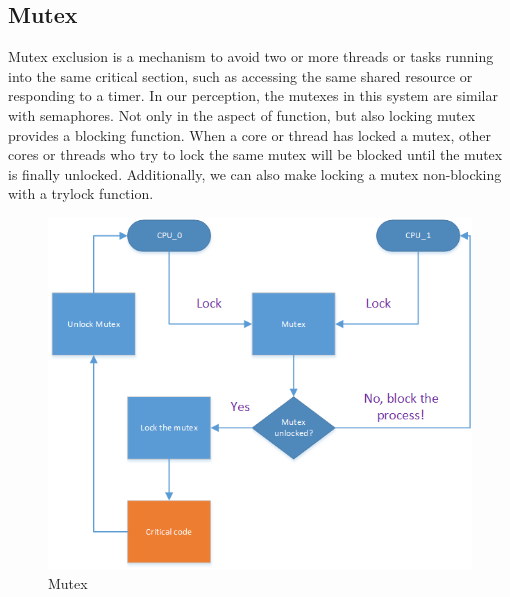 \documentclass[conference]{IEEEtran}
\begin{document}
\subsection{Mutex}
Mutex exclusion is a mechanism to avoid two or more threads or tasks running into the same critical section, such as accessing the same shared resource or responding to a timer\cite{courtois1971concurrent}. In our perception, the mutexes in this system are similar with semaphores. Not only in the aspect of function, but also locking mutex provides a blocking function. When a core or thread has locked a mutex, other cores or threads who try to lock the same mutex will be blocked until the mutex is finally unlocked. Additionally, we can also make locking a mutex non-blocking with a trylock function.
\begin{figure}[h]
	\centering
	\includegraphics[scale=0.55]{mutex.png}
	\caption{Mutex}
	\label{fig:mutex}
\end{figure}
\end{document}
